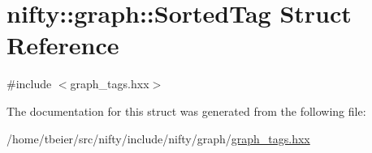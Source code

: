 \hypertarget{structnifty_1_1graph_1_1SortedTag}{}\section{nifty\+:\+:graph\+:\+:Sorted\+Tag Struct Reference}
\label{structnifty_1_1graph_1_1SortedTag}


{\ttfamily \#include $<$graph\+\_\+tags.\+hxx$>$}



The documentation for this struct was generated from the following file\+:\begin{DoxyCompactItemize}
\item 
/home/tbeier/src/nifty/include/nifty/graph/\hyperlink{graph__tags_8hxx}{graph\+\_\+tags.\+hxx}\end{DoxyCompactItemize}

